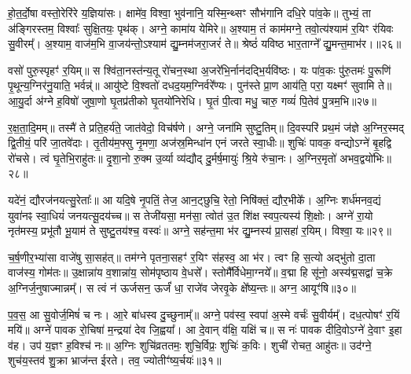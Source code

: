 हो॒त॒र्दो॒षा वस्तो॒रेरि॑रे य॒ज्ञिया॑सः। क्षामे॑व॒ विश्वा॒ भुव॑नानि॒ यस्मि॒न्थ्सꣳ सौभ॑गानि दधि॒रे पा॑व॒के॥ तुभ्यं॒ ता अ॑ङ्गिरस्तम॒ विश्वाः᳚ सुक्षि॒तयः॒ पृथ॑क्। अग्ने॒ कामा॑य येमिरे॥ अ॒श्याम॒ तं काम॑मग्ने॒ तवो॒त्य॑श्याम॑ र॒यिꣳ र॑यिवः सु॒वीरम्᳚। अ॒श्याम॒ वाज॑म॒भि वा॒जय॑न्तो॒\-ऽश्याम॑ द्यु॒म्नम॑जरा॒जरं॑ ते॥ श्रेष्ठं॑ यविष्ठ भार॒ताग्ने᳚ द्यु॒मन्त॒माभ॑र।॥२६॥

वसो॑ पुरु॒स्पृहꣳ॑ र॒यिम्॥ स श्वि॑ता॒नस्त॑न्य॒तू रो॑चन॒स्था अ॒जरे॑भि॒र्नान॑दद्भि॒र्यवि॑ष्ठः। यः पा॑व॒कः पु॑रु॒तमः॑ पु॒रूणि॑ पृ॒थून्य॒ग्निर॑नु॒याति॒ भर्वन्न्॑॥ आयु॑ष्टे वि॒श्वतो॑ दधद॒यम॒ग्निर्वरे᳚ण्यः। पुन॑स्ते प्रा॒ण आय॑ति॒ परा॒ यक्ष्मꣳ॑ सुवामि ते॥ आ॒यु॒र्दा अ॑ग्ने ह॒विषो॑ जुषा॒णो घृ॒तप्र॑तीको घृ॒तयो॑निरेधि। घृ॒तं पी॒त्वा मधु॒ चारु॒ गव्यं॑ पि॒तेव॑ पु॒त्रम॒भि॥२७॥

र॒क्ष॒ता॒दि॒मम्॥ तस्मै॑ ते प्रति॒हर्य॑ते॒ जात॑वेदो॒ विच॑र्\mbox{}षणे। अग्ने॒ जना॑मि सुष्टु॒तिम्॥ दि॒वस्परि॑ प्रथ॒मं ज॑ज्ञे अ॒ग्निर॒स्मद् द्वि॒तीयं॒ परि॑ जा॒तवे॑दाः। तृ॒तीय॑म॒फ्सु नृ॒मणा॒ अज॑स्र॒मिन्धा॑न एनं जरते स्वा॒धीः॥ शुचिः॑ पावक॒ वन्द्यो\-ऽग्ने॑ बृ॒हद्वि रो॑चसे। त्वं घृ॒तेभि॒राहु॑तः॥ दृ॒शा॒नो रु॒क्म उ॒र्व्या व्य॑द्यौद् दु॒र्मर्\mbox{}ष॒मायुः॑ श्रि॒ये रु॑चा॒नः। अ॒ग्निर॒मृतो॑ अभव॒द्वयो॑भिः॥२८॥

यदे॑नं॒ द्यौरज॑नयत्सु॒रेताः᳚॥ आ यदि॒षे नृ॒पतिं॒ तेज॒ आन॒ट्छुचि॒ रेतो॒ निषि॑क्तं॒ द्यौर॒भीके᳚। अ॒ग्निः शर्ध॑मनव॒द्यं युवा॑नꣴ स्वा॒धियं॑ जनयत्सू॒दय॑च्च॥ स तेजी॑यसा॒ मन॑सा॒ त्वोत॑ उ॒त शि॑क्ष स्वप॒त्यस्य॑ शि॒क्षोः। अग्ने॑ रा॒यो नृत॑मस्य॒ प्रभू॑तौ भू॒याम॑ ते सुष्टु॒तय॑श्च॒ वस्वः॑॥ अग्ने॒ सह॑न्त॒मा भ॑र द्यु॒म्नस्य॑ प्रा॒सहा॑ र॒यिम्। विश्वा॒ यः॥२९॥

च॒र्\mbox{}ष॒णीर॒भ्या॑सा वाजे॑षु सा॒सह॑त्॥ तम॑ग्ने पृतना॒सहꣳ॑ र॒यिꣳ स॑हस्व॒ आ भ॑र। त्वꣳ हि स॒त्यो अद्भु॑तो दा॒ता वाज॑स्य॒ गोम॑तः॥ उ॒क्षान्ना॑य व॒शान्ना॑य॒ सोम॑पृष्ठाय वे॒धसे᳚। स्तोमै᳚र्विधेमा॒ग्नये᳚॥ व॒द्मा हि सू॑नो॒ अस्य॑द्म॒सद्वा॑ च॒क्रे अ॒ग्निर्ज॒नुषाज्मान्नम्᳚। स त्वं न॑ ऊर्जसन॒ ऊर्जं॑ धा॒ राजे॑व जेरवृ॒के क्षे᳚ष्य॒न्तः॥ अग्न॒ आयूꣳ॑षि॥३०॥

प॒व॒स॒ आ सु॒वोर्ज॒मिषं॑ च नः। आ॒रे बा॑धस्व दु॒च्छुनाम्᳚॥ अग्ने॒ पव॑स्व॒ स्वपा॑ अ॒स्मे वर्चः॑ सु॒वीर्यम्᳚। दध॒त्पोषꣳ॑ र॒यिं मयि॑॥ अग्ने॑ पावक रो॒चिषा॑ म॒न्द्रया॑ देव जि॒ह्वया᳚। आ दे॒वान् व॑क्षि॒ यक्षि॑ च॥ स नः॑ पावक दीदि॒वो\-ऽग्ने॑ दे॒वाꣳ इ॒हा व॑ह। उप॑ य॒ज्ञꣳ ह॒विश्च॑ नः॥ अ॒ग्निः शुचि॑व्रततमः॒ शुचि॒र्विप्रः॒ शुचिः॑ क॒विः। शुची॑ रोचत॒ आहु॑तः॥ उद॑ग्ने॒ शुच॑य॒स्तव॑ शु॒क्रा भ्राज॑न्त ईरते। तव॒ ज्योतीꣳ॑ष्य॒र्चयः॑॥३१॥

{\anuvakamend[{पु॒रु॒नि॒ष्ठः पु॑र्वणीक भरा॒\-ऽभि वयो॑भि॒र्य आयूꣳ॑षि॒ विप्रः॒ शुचि॒श्चतु॑र्दश च॥14॥}]}

